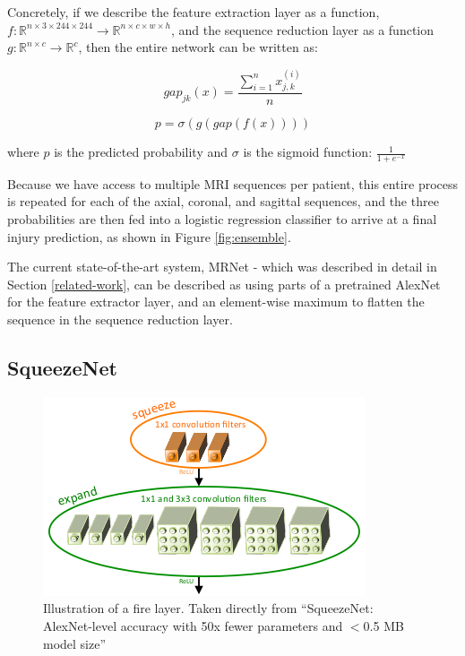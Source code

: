 \documentclass[10pt,twocolumn,letterpaper]{article}
\begin{document}
Concretely, if we describe the feature extraction layer as a function, $f: \mathbb{R}^{n \times 3 \times 244 \times 244} \rightarrow \mathbb{R}^{n \times c \times w \times h}$, and the sequence reduction layer as a function $g: \mathbb{R}^{n \times c} \rightarrow \mathbb{R}^c$, then the entire network can be written as:

$$ gap_{jk}(x) = \frac{\sum_{i=1}^n x_{j,k}^{(i)}}{n} $$

\begin{equation}
\label{eq:network}
p = \sigma(g(gap(f(x))))
\end{equation}

where $p$ is the predicted probability and $\sigma$ is the sigmoid function: $\frac{1}{1 + e^{-x}}$

Because we have access to multiple MRI sequences per patient, this entire process is repeated for each of the axial, coronal, and sagittal sequences, and the three probabilities are then fed into a logistic regression classifier to arrive at a final injury prediction, as shown in Figure \ref{fig:ensemble}.

The current state-of-the-art system, MRNet - which was described in detail in Section \ref{related-work}, can be described as using parts of a pretrained AlexNet for the feature extractor layer, and an element-wise maximum to flatten the sequence in the sequence reduction layer.

\subsection{SqueezeNet}


\begin{figure}
\begin{center}
\includegraphics[width=0.6\linewidth]{../images/fire/fire.png}
\end{center}
   \caption{Illustration of a fire layer. Taken directly from ``SqueezeNet: AlexNet-level accuracy with 50x fewer parameters and $<$0.5 MB model size''\cite{iandola2016squeezenet}}
\label{fig:fire}
\end{figure}
\end{document}
